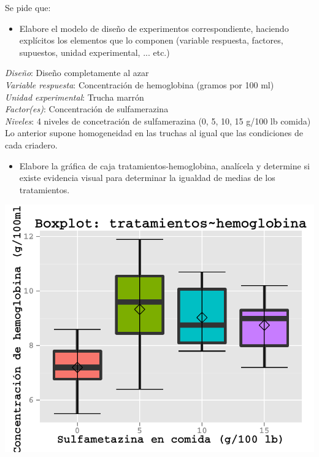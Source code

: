 \documentclass[a4paper]{scrartcl}\usepackage[]{graphicx}\usepackage[]{color}
\makeatletter
\def\maxwidth{ %
  \ifdim\Gin@nat@width>\linewidth
    \linewidth
  \else
    \Gin@nat@width
  \fi
}
\newenvironment{knitrout}{}{} %
\makeatother
\begin{document}
Se pide que:

\begin{itemize}
  \item Elabore el modelo de diseño de experimentos correspondiente, haciendo explícitos los elementos que lo componen (variable respuesta, factores, supuestos, unidad experimental, ... etc.)
\end{itemize}

\noindent\emph{Diseño}: Diseño completamente al azar\\
\emph{Variable respuesta}: Concentración de hemoglobina (gramos por 100 ml)\\
\emph{Unidad experimental}: Trucha marrón\\
\emph{Factor(es)}: Concentración de sulfamerazina\\
\emph{Niveles}: 4 niveles de concetración de sulfamerazina (0, 5, 10, 15 g/100 lb comida)\\

\noindent Lo anterior supone homogeneidad en las truchas al igual que las condiciones de cada criadero.

\begin{itemize}
  \item Elabore la gráfica de caja tratamientos-hemoglobina, analícela y determine si existe evidencia visual para determinar la igualdad de medias de los tratamientos.
\end{itemize}

\begin{knitrout}
\color{fgcolor}

{\centering \includegraphics[width=\maxwidth]{figure/unnamed-chunk-13} 

}



\end{knitrout}
\end{document}
